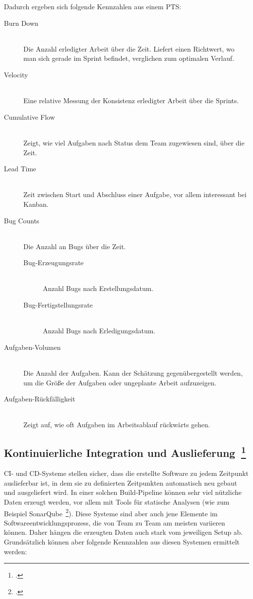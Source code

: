 Dadurch ergeben sich folgende Kennzahlen aus einem \ac{PTS}:
\begin{description}
  \item[Burn Down] \hfill \\ Die Anzahl erledigter Arbeit über die Zeit. Liefert einen Richtwert, wo man sich gerade im Sprint befindet, verglichen zum optimalen Verlauf.
  \item[Velocity] \hfill \\ Eine relative Messung der Konsistenz erledigter Arbeit über die Sprints.
  \item[Cumulative Flow] \hfill \\ Zeigt, wie viel Aufgaben nach Status dem Team zugewiesen sind, über die Zeit.
  \item[Lead Time] \hfill \\ Zeit zwischen Start und Abschluss einer Aufgabe, vor allem interessant bei Kanban.
  \item[Bug Counts] \hfill \\ Die Anzahl an Bugs über die Zeit.
  \begin{description}
    \item[Bug-Erzeugungsrate] \hfill \\ Anzahl Bugs nach Erstellungsdatum.
    \item[Bug-Fertigstellungsrate] \hfill \\ Anzahl Bugs nach Erledigungsdatum.
  \end{description}
  \item[Aufgaben-Volumen] \hfill \\ Die Anzahl der Aufgaben. Kann der Schätzung gegenübergestellt werden, um die Größe der Aufgaben oder ungeplante Arbeit aufzuzeigen.
  \item[Aufgaben-Rückfälligkeit] \hfill \\ Zeigt auf, wie oft Aufgaben im Arbeitsablauf rückwärts gehen.
\end{description}

\subsection[Kontinuierliche Integration und Auslieferung]{Kontinuierliche Integration und Auslieferung~\footcite[vgl.][S.84ff]{davis_agile_2015}}

\acf{CI}- und \acf{CD}-Systeme stellen sicher, dass die erstellte Software zu jedem Zeitpunkt auslieferbar ist, in dem sie zu definierten Zeitpunkten automatisch neu gebaut und ausgeliefert wird.
In einer solchen Build-Pipeline können sehr viel nützliche Daten erzeugt werden, vor allem mit Tools für statische Analysen (wie zum Beispiel SonarQube~\footcite[][]{sonarqube}).
Diese Systeme sind aber auch jene Elemente im Softwareentwicklungsprozess, die von Team zu Team am meisten variieren können.
Daher hängen die erzeugten Daten auch stark vom jeweiligen Setup ab.
Grundsätzlich können aber folgende Kennzahlen aus diesen Systemen ermittelt werden:


